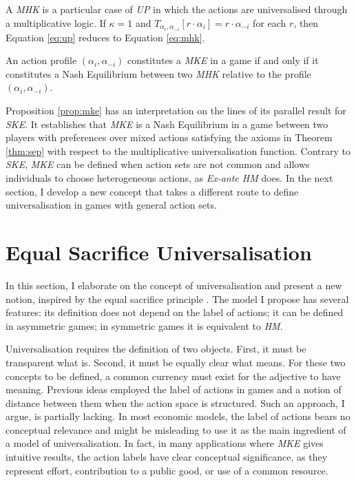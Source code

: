 A \textit{MHK} is a particular case of \textit{UP} in which the actions are universalised through a multiplicative logic. If \( \kappa = 1 \) and \( T_{\alpha_i, \alpha_{-i}} [ r \cdot \alpha_i ] = r \cdot \alpha_{-i} \) for each \( r \), then Equation \eqref{eq:up} reduces to Equation \eqref{eq:mhk}.

\begin{prop}\label{prop:mke}
	An action profile \( (\alpha_i, \alpha_{-i}) \) constitutes a \textit{MKE} in a game if and only if it constitutes a Nash Equilibrium between two \textit{MHK} relative to the profile \( ( \alpha_{i}, \alpha_{-i} ) \).
\end{prop}

Proposition \ref{prop:mke} has an interpretation on the lines of its parallel result for \textit{SKE}. It establishes that \textit{MKE} is a Nash Equilibrium in a game between two players with preferences over mixed actions satisfying the axioms in Theorem \ref{thm:sep} with respect to the multiplicative universalisation function. Contrary to \textit{SKE}, \textit{MKE} can be defined when action sets are not common and allows individuals to choose heterogeneous actions, as \textit{Ex-ante HM} does. In the next section, I develop a new concept that takes a different route to define universalisation in games with general action sets.

\section{Equal Sacrifice Universalisation}\label{sec:esu}

In this section, I elaborate on the concept of universalisation and present a new notion, inspired by the equal sacrifice principle \citep{mill1885principles,youngDistributiveJusticeTaxation1988}. The model I propose has several features: its definition does not depend on the label of actions; it can be defined in asymmetric games; in symmetric games it is equivalent to \textit{HM}.

Universalisation requires the definition of two objects. First, it must be transparent what  is. Second, it must be equally clear what  means. For these two concepts to be defined, a common currency must exist for the adjective  to have meaning. Previous ideas employed the label of actions in games and a notion of distance between them when the action space is structured. Such an approach, I argue, is partially lacking. In most economic models, the label of actions bears no conceptual relevance and might be misleading to use it as the main ingredient of a model of universalisation. In fact, in many applications where \textit{MKE} gives intuitive results, the action labels have clear conceptual significance, as they represent effort, contribution to a public good, or use of a common resource.

